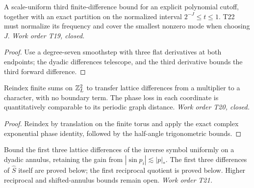\begin{lemma}\label{lem:cutoff}
  \leanok
  A scale-uniform third finite-difference bound for an explicit polynomial
  cutoff, together with an exact partition on the normalized interval
  $2^{-J}\le t\le1$. T22 must normalize its frequency and cover the smallest
  nonzero mode when choosing $J$. \emph{Work order T19, closed.}
\end{lemma}
\begin{proof}\leanok
  Use a degree-seven smoothstep with three flat derivatives at both endpoints;
  the dyadic differences telescope, and the third derivative bounds the third
  forward difference.
\end{proof}

\begin{lemma}\label{lem:abel}
  \leanok
  Reindex finite sums on $\mathbb{Z}_L^2$ to transfer lattice differences from a
  multiplier to a character, with no boundary term. The phase loss in each
  coordinate is quantitatively comparable to its periodic graph distance.
  \emph{Work order T20, closed.}
\end{lemma}
\begin{proof}\leanok
  Reindex by translation on the finite torus and apply the exact complex
  exponential phase identity, followed by the half-angle trigonometric bounds.
\end{proof}

\begin{lemma}\label{lem:symbol-diff}
  Bound the first three lattice differences of the inverse symbol uniformly
  on a dyadic annulus, retaining the gain from $|\sin p_i|\lesssim|p|_*$.
  The first three differences of $\widehat S$ itself are proved below;
  the first reciprocal quotient is proved below. Higher reciprocal and
  shifted-annulus bounds remain open. \emph{Work order T21.}
\end{lemma}

